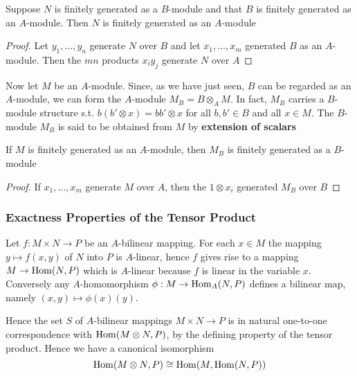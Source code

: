 \documentclass[11pt]{article}
\begin{document}
\begin{proposition}[]
Suppose \(N\) is finitely generated as a \(B\)-module and that \(B\) is finitely generated as
an \(A\)-module. Then \(N\) is finitely generated as an \(A\)-module
\end{proposition}

\begin{proof}
Let \(y_1,\dots,y_n\) generate \(N\) over \(B\) and let \(x_1,\dots,x_m\) generated \(B\) as
an \(A\)-module. Then the \(mn\) products \(x_iy_j\) generate \(N\) over \(A\)
\end{proof}

Now let \(M\) be an \(A\)-module. Since, as we have just seen, \(B\) can be regarded as
an \(A\)-module, we can form the \(A\)-module \(M_B=B\otimes_AM\). In fact, \(M_B\) carries
a \(B\)-module structure s.t. \(b(b'\otimes x)=bb'\otimes x\) for all \(b,b'\in B\) and all \(x\in M\).
The \(B\)-module \(M_B\) is said to be obtained from \(M\) by \textbf{extension of scalars}

\begin{proposition}[]
If \(M\) is finitely generated as an \(A\)-module, then \(M_B\) is finitely generated as a \(B\)-module
\end{proposition}

\begin{proof}
If \(x_1,\dots,x_m\) generate \(M\) over \(A\), then the \(1\otimes x_i\) generated \(M_B\) over \(B\)
\end{proof}
\subsubsection{Exactness Properties of the Tensor Product}
\label{sec:orgb0085b8}
Let \(f:M\times N\to P\) be an \(A\)-bilinear mapping. For each \(x\in M\) the mapping \(y\mapsto f(x,y)\)
of \(N\) into \(P\) is \(A\)-linear, hence \(f\) gives rise to a mapping \(M\to\operatorname{Hom}(N,P)\) which
is \(A\)-linear because \(f\) is linear in the variable \(x\). Conversely
any \(A\)-homomorphism \(\phi:M\to\operatorname{Hom}_A(N,P)\) defines a bilinear map, namely \((x,y)\mapsto\phi(x)(y)\).

Hence the set \(S\) of \(A\)-bilinear mappings \(M\times N\to P\) is in natural one-to-one
correspondence with \(\operatorname{Hom}(M\otimes N,P)\), by the defining property of the tensor product. Hence we
have a canonical isomorphism
\begin{equation*}
\operatorname{Hom}(M\otimes N,P)\cong\operatorname{Hom}(M,\operatorname{Hom}(N,P))
\end{equation*}
\end{document}
